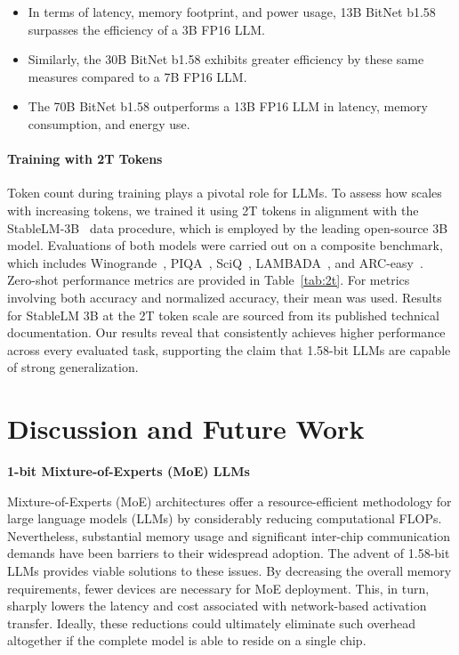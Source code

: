 \begin{itemize}
    \item In terms of latency, memory footprint, and power usage, 13B BitNet b1.58 surpasses the efficiency of a 3B FP16 LLM.
    \item Similarly, the 30B BitNet b1.58 exhibits greater efficiency by these same measures compared to a 7B FP16 LLM.
    \item The 70B BitNet b1.58 outperforms a 13B FP16 LLM in latency, memory consumption, and energy use.
\end{itemize}

\paragraph{Training with 2T Tokens}

Token count during training plays a pivotal role for LLMs. To assess how  scales with increasing tokens, we trained it using 2T tokens in alignment with the StableLM-3B~\cite{StableLM-3B-4E1T} data procedure, which is employed by the leading open-source 3B model. Evaluations of both models were carried out on a composite benchmark, which includes Winogrande~\cite{winoGrande}, PIQA~\cite{piqa}, SciQ~\cite{sciq}, LAMBADA~\cite{lambada}, and ARC-easy~\cite{arc}. Zero-shot performance metrics are provided in Table~\ref{tab:2t}. For metrics involving both accuracy and normalized accuracy, their mean was used. Results for StableLM 3B at the 2T token scale are sourced from its published technical documentation. Our results reveal that  consistently achieves higher performance across every evaluated task, supporting the claim that 1.58-bit LLMs are capable of strong generalization.

\section{Discussion and Future Work}

\textbf{1-bit Mixture-of-Experts (MoE) LLMs}

Mixture-of-Experts (MoE) architectures offer a resource-efficient methodology for large language models (LLMs) by considerably reducing computational FLOPs. Nevertheless, substantial memory usage and significant inter-chip communication demands have been barriers to their widespread adoption. The advent of 1.58-bit LLMs provides viable solutions to these issues. By decreasing the overall memory requirements, fewer devices are necessary for MoE deployment. This, in turn, sharply lowers the latency and cost associated with network-based activation transfer. Ideally, these reductions could ultimately eliminate such overhead altogether if the complete model is able to reside on a single chip.

